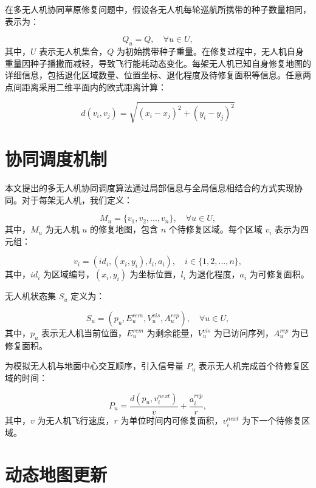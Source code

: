 \documentclass[AutoFakeBold]{LZUThesis}
\begin{document}
在多无人机协同草原修复问题中，假设各无人机每轮巡航所携带的种子数量相同，表示为：

\begin{equation}
	Q_u = Q, \quad \forall u \in U,
\end{equation}
其中，$U$ 表示无人机集合，$Q$ 为初始携带种子重量。在修复过程中，无人机自身重量因种子播撒而减轻，导致飞行能耗动态变化。每架无人机已知自身修复地图的详细信息，包括退化区域数量、位置坐标、退化程度及待修复面积等信息。任意两点间距离采用二维平面内的欧式距离计算：

\begin{equation}
	d(v_i, v_j) = \sqrt{(x_i - x_j)^2 + (y_i - y_j)^2}
\end{equation}

\section{协同调度机制}

本文提出的多无人机协同调度算法通过局部信息与全局信息相结合的方式实现协同。对于每架无人机，我们定义：

\begin{equation}
	M_u = \{v_1, v_2, ..., v_n\}, \quad \forall u \in U,
\end{equation}
其中，$M_u$ 为无人机 $u$ 的修复地图，包含 $n$ 个待修复区域。每个区域 $v_i$ 表示为四元组：

\begin{equation}
	v_i = (id_i, (x_i, y_i), l_i, a_i), \quad i \in \{1,2,...,n\},
\end{equation}
其中，$id_i$ 为区域编号，$(x_i, y_i)$ 为坐标位置，$l_i$ 为退化程度，$a_i$ 为可修复面积。

无人机状态集 $S_u$ 定义为：

\begin{equation}
	S_u = (p_u, E_u^{rem}, V_u^{vis}, A_u^{rep}), \quad \forall u \in U,
\end{equation}
其中，$p_u$ 表示无人机当前位置，$E_u^{rem}$ 为剩余能量，$V_u^{vis}$ 为已访问序列，$A_u^{rep}$ 为已修复面积。

为模拟无人机与地面中心交互顺序，引入信号量 $P_u$ 表示无人机完成首个待修复区域的时间：

\begin{equation}
	P_u = \frac{d(p_u, v_i^{next})}{v} + \frac{a_i^{rep}}{r},
\end{equation}
其中，$v$ 为无人机飞行速度，$r$ 为单位时间内可修复面积，$v_i^{next}$ 为下一个待修复区域。

\section{动态地图更新}
\end{document}
